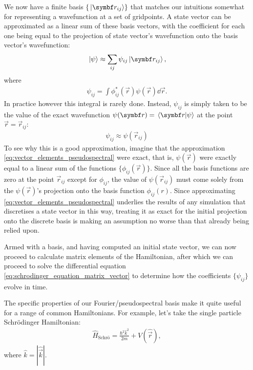 We now have a finite basis $\{\ket{\vec r_{ij}}\}$ that matches our intuitions somewhat for representing a wavefunction at a set of gridpoints. A state vector can be approximated as a linear sum of these basis vectors, with the coefficient for each one being equal to the projection of state vector's wavefunction onto the basis vector's wavefunction:
\begin{align}\label{eq:vector_elements_pseudospectral}
\ket{\psi} \approx \sum_{ij} \psi_{ij} \ket{\vec r_{i j}},
\end{align}
where
\begin{align}
\psi_{i j} = \int \phi_{ij}^*(\vec r) \psi(\vec r) \dd{\vec r}.
\end{align}
In practice however this integral is rarely done. Instead, $\psi_{ij}$ is simply taken to be the value of the exact wavefunction $\psi(\vec r) = \braket{\vec r}{\psi}$ at the point $\vec r = \vec r_{ij}$:
\begin{align}\label{eq:pseudospectral_vector}
\psi_{i j} \approx \psi(\vec r_{ij})
\end{align}
 To see why this is a good approximation, imagine that the approximation \eqref{eq:vector_elements_pseudospectral} were exact, that is, $\psi(\vec r)$ were exactly equal to a linear sum of the functions $\{\phi_{ij}(\vec r)\}$. Since all the basis functions are zero at the point $\vec r_{ij}$ except for $\phi_{ij}$, the value of $\psi(\vec r_{ij})$ must come solely from the $\psi(\vec r)$'s projection onto the basis function $\phi_{ij}(r)$. Since approximating \eqref{eq:vector_elements_pseudospectral} underlies the results of any simulation that discretises a state vector in this way, treating it as exact for the initial projection onto the discrete basis is making an assumption no worse than that already being relied upon.


Armed with a basis, and having computed an initial state vector, we can now proceed to calculate matrix elements of the Hamiltonian, after which we can proceed to solve the differential equation \eqref{eq:schrodinger_equation_matrix_vector} to determine how the coefficients $\{\psi_{ij}\}$ evolve in time.

The specific properties of our Fourier/pseudospectral basis make it quite useful for a range of common Hamiltonians. For example, let's take the single particle Schr\"odinger Hamiltonian:
\begin{align}
\hat H_\textrm{Schr\"o} = \frac{\hbar^2 \hat k ^2}{2m}  + V(\hat {\vec r}),
\end{align}
where $\hat k = |\hat{\vec k}|$.

